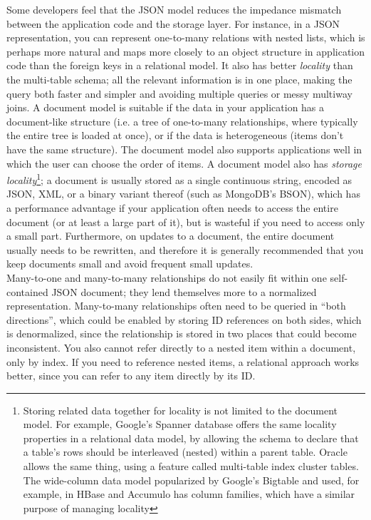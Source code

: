 \documentclass[table, xcdraw]{article}%
\begin{document}
Some developers feel that the JSON model reduces the impedance mismatch between the application code and the storage layer. For instance, in a JSON representation, you can represent one-to-many relations with nested lists, which is perhaps more natural and maps more closely to an object structure in application code than the foreign keys in a relational model. It also has better \textit{locality} than the multi-table schema; all the relevant information is in one place, making the query both faster and simpler and avoiding multiple queries or messy multiway joins. A document model is suitable if the data in your application has a document-like structure (i.e. a tree of one-to-many relationships, where typically the entire tree is loaded at once), or if the data is heterogeneous (items don't have the same structure). The document model also supports applications well in which the user can choose the order of items. A document model also has \textit{storage locality}\footnote{Storing related data together for locality is not limited to the document model. For example, Google’s Spanner database offers the same locality properties in a relational data model, by allowing the schema to declare that a table’s rows should be interleaved (nested) within a parent table. Oracle allows the same thing, using a feature called multi-table index cluster tables. The wide-column data model popularized by Google’s Bigtable and used, for example, in HBase and Accumulo has column families, which have a similar purpose of managing locality}; a document is usually stored as a single continuous string, encoded as JSON, XML, or a binary variant thereof (such as MongoDB’s BSON), which has a performance advantage if your application often needs to access the entire document (or at least a large part of it), but is wasteful if you need to access only a small part.  Furthermore, on updates to a document, the entire document usually needs to be rewritten, and therefore it is generally recommended that you keep documents small and avoid frequent small updates.\\
Many-to-one and many-to-many relationships do not easily fit within one self-contained JSON document; they lend themselves more to a normalized representation. Many-to-many relationships often need to be queried in “both directions”, which could be enabled by storing ID references on both sides, which is denormalized, since the relationship is stored in two places that could become inconsistent. You also cannot refer directly to a nested item within a document, only by index. If you need to reference nested items, a relational approach works better, since you can refer to any item directly by its ID.
\end{document}

